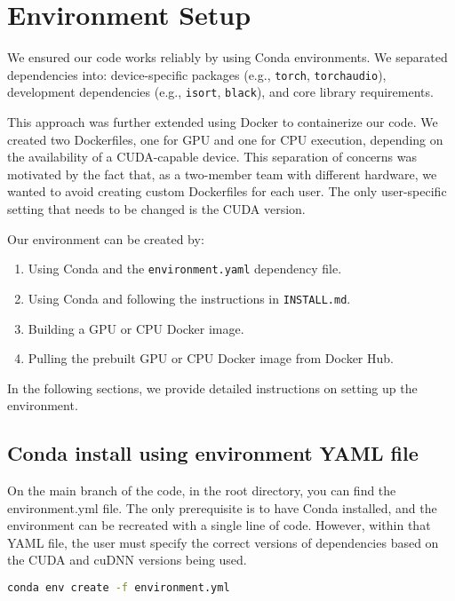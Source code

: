 \chapter{Environment Setup}
\label{ch:env_setup}

We ensured our code works reliably by using Conda environments. We separated dependencies into:
device-specific packages (e.g., \texttt{torch}, \texttt{torchaudio}), development dependencies (e.g., \texttt{isort}, \texttt{black}), and core library requirements.

This approach was further extended using Docker to containerize our code. We created two Dockerfiles, one for GPU and one for CPU execution, depending on the availability of a CUDA-capable device. This separation of concerns was motivated by the fact that, as a two-member team with different hardware, we wanted to avoid creating custom Dockerfiles for each user. The only user-specific setting that needs to be changed is the CUDA version.

Our environment can be created by:
\begin{enumerate}
    \item Using Conda and the \texttt{environment.yaml} dependency file.
    \item Using Conda and following the instructions in \texttt{INSTALL.md}.
    \item Building a GPU or CPU Docker image.
    \item Pulling the prebuilt GPU or CPU Docker image from Docker Hub.
\end{enumerate}

In the following sections, we provide detailed instructions on setting up the environment.

\section{Conda install using environment YAML file} 

On the main branch of the code, in the root directory, you can find the environment.yml file. The only prerequisite is to have Conda installed, and the environment can be recreated with a single line of code. However, within that YAML file, the user must specify the correct versions of dependencies based on the CUDA and cuDNN versions being used.

\begin{lstlisting}[language=bash, caption={Creating Conda environment from \texttt{environment.yml}}, label=list:create_conda_env]
           conda env create -f environment.yml
\end{lstlisting}

